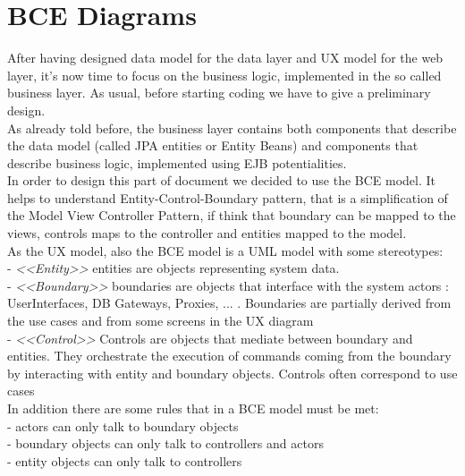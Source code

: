 \documentclass[12pt]{book}
\begin{document}
\chapter{BCE Diagrams}
After having designed data model for the data layer and UX model for the web layer, it's now time to focus on the business logic, implemented in the so called business layer. As usual, before starting coding we have to give a preliminary design. \\
As already told before, the business layer contains both components that describe the data model (called JPA entities or Entity Beans) and components that describe business logic, implemented using EJB potentialities.\\

In order to design this part of document we decided to use the BCE model. It helps to understand Entity-Control-Boundary pattern, that is a simplification of the Model View Controller Pattern, if think that boundary can be mapped to the views, controls maps to the controller and entities mapped to the model. \\

As the UX model, also the BCE model is a UML model with some stereotypes: \\

- \textit{<<Entity>>} entities are objects representing system data. \\

- \textit{<<Boundary>>} boundaries are objects that interface with the system actors : UserInterfaces, DB Gateways, Proxies, ... . Boundaries are partially derived from the use cases and from some screens in the UX diagram\\

- \textit{<<Control>>} Controls are objects that mediate between boundary and entities. They orchestrate the execution of commands coming from the boundary by interacting with entity and boundary objects. Controls often correspond to use cases\\

In addition there are some rules that in a BCE model must be met: \\

- actors can only talk to boundary objects \\

- boundary objects can only talk to controllers and actors\\

- entity objects can only talk to controllers\\
\end{document}
